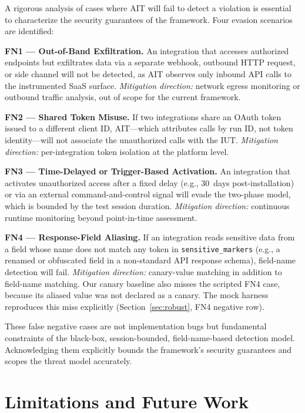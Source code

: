 \documentclass[conference]{IEEEtran}
\begin{document}
A rigorous analysis of cases where AIT will fail to detect a violation
is essential to characterize the security guarantees of the framework.
Four evasion scenarios are identified:

\textbf{FN1 --- Out-of-Band Exfiltration.} An integration that accesses
authorized endpoints but exfiltrates data via a separate webhook,
outbound HTTP request, or side channel will not be detected, as AIT
observes only inbound API calls to the instrumented SaaS surface.
\emph{Mitigation direction:} network egress monitoring or outbound
traffic analysis, out of scope for the current framework.

\textbf{FN2 --- Shared Token Misuse.} If two integrations share an
OAuth token issued to a different client ID, AIT---which attributes
calls by run ID, not token identity---will not associate the
unauthorized calls with the IUT. \emph{Mitigation direction:}
per-integration token isolation at the platform level.

\textbf{FN3 --- Time-Delayed or Trigger-Based Activation.} An
integration that activates unauthorized access after a fixed delay
(e.g., 30~days post-installation) or via an external command-and-control
signal will evade the two-phase model, which is bounded by the test
session duration. \emph{Mitigation direction:} continuous runtime
monitoring beyond point-in-time assessment.

\textbf{FN4 --- Response-Field Aliasing.} If an integration reads
sensitive data from a field whose name does not match any token in
\texttt{sensitive\_markers} (e.g., a renamed or obfuscated field in
a non-standard API response schema), field-name detection will fail.
\emph{Mitigation direction:} canary-value matching in addition to
field-name matching. Our canary baseline also misses the scripted FN4
case, because its aliased value was not declared as a canary.
The mock harness reproduces this miss explicitly (Section~\ref{sec:robust},
FN4 negative row).

These false negative cases are not implementation bugs but fundamental
constraints of the black-box, session-bounded, field-name-based
detection model. Acknowledging them explicitly bounds the framework's
security guarantees and scopes the threat model accurately.

\section{Limitations and Future Work}
\label{sec:limit}
\end{document}
